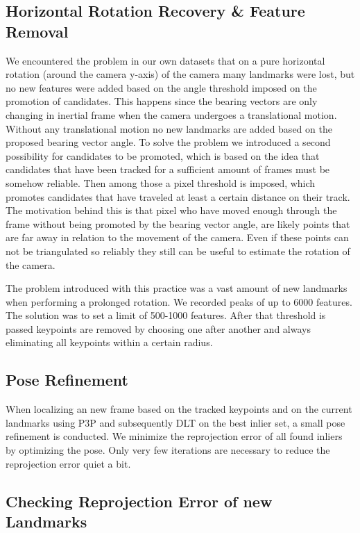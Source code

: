 \documentclass{article}
\begin{document}
\subsection{Horizontal Rotation Recovery \& Feature Removal}
\label{sec:yaw}
We encountered the problem in our own datasets that on a pure horizontal rotation (around the camera y-axis) of the camera many landmarks were lost, but no new features were added based on the angle threshold imposed on the promotion of candidates.
%
This happens since the bearing vectors are only changing in inertial frame when the camera undergoes a translational motion.
%
Without any translational motion no new landmarks are added based on the proposed bearing vector angle.
%
To solve the problem we introduced a second possibility for candidates to be promoted, which is based on the idea that candidates that have been tracked for a sufficient amount of frames must be somehow reliable.
%
Then among those a pixel threshold is imposed, which promotes candidates that have traveled at least a certain distance on their track.
%
The motivation behind this is that pixel who have moved enough through the frame without being promoted by the bearing vector angle, are likely points that are far away in relation to the movement of the camera.
%
Even if these points can not be triangulated  so reliably they still can be useful to estimate the rotation of the camera.

The problem introduced with this practice was a vast amount of new landmarks when performing a prolonged rotation. We recorded peaks of up to 6000 features. The solution was to set a limit of 500-1000 features. After that threshold is passed keypoints are removed  by choosing one after another and always eliminating all keypoints within a certain radius.

\subsection{Pose Refinement}

When localizing an new frame based on the tracked keypoints and on the current landmarks using P3P and subsequently DLT on the best inlier set, a small pose refinement is conducted. We minimize the reprojection error of all found inliers by optimizing the pose. Only very few iterations are necessary to reduce the reprojection error quiet a bit.

\subsection{Checking Reprojection Error of new Landmarks}
\end{document}
